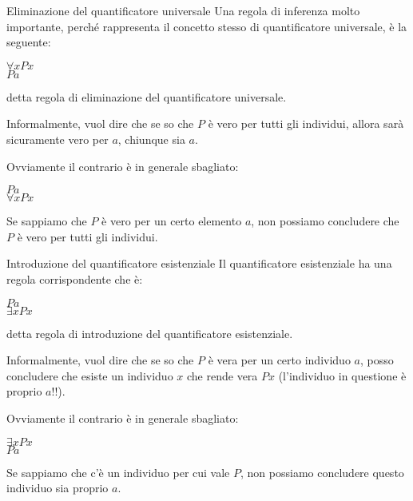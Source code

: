 \documentclass[aspectratio=169,10pt,dvipsnames,xcolor=table,handout]{beamer}
\begin{document}
\begin{frame}{Eliminazione del quantificatore universale}
    Una regola di inferenza molto importante, perché rappresenta il concetto stesso di quantificatore universale, è la seguente:
    \begin{center}
        \begin{inference}
            $\forall x Px$\\
            \hline
            $Pa$
        \end{inference}
    \end{center}
    detta regola di \alert{eliminazione del quantificatore universale}.

    \medskip
    Informalmente, vuol dire che se so che $P$ è vero per tutti gli individui, allora sarà sicuramente vero per $a$, chiunque sia $a$.

    \medskip
    Ovviamente il contrario è in generale sbagliato:
    \begin{center}
        \begin{inference}
            $Pa$\\
            \hline
            $\forall x Px$
        \end{inference}
    \end{center}
    Se sappiamo che $P$ è vero per un certo elemento $a$, non possiamo concludere che $P$ è vero per tutti gli individui.
\end{frame}

\begin{frame}{Introduzione del quantificatore esistenziale}
    Il quantificatore esistenziale ha una regola corrispondente che è:
    \begin{center}
        \begin{inference}
            $Pa$\\
            \hline
            $\exists x Px$
        \end{inference}
    \end{center}
    detta regola di \alert{introduzione del quantificatore esistenziale}.

    \medskip
    Informalmente, vuol dire che se so che $P$ è vera per un certo individuo $a$, posso concludere che esiste un individuo $x$ che rende vera $Px$ (l'individuo in questione è proprio $a$!!).

    \medskip
    Ovviamente il contrario è in generale sbagliato:
    \begin{center}
        \begin{inference}
            $\exists x Px$\\
            \hline
            $Pa$
        \end{inference}
    \end{center}
    Se sappiamo che c'è un individuo per cui vale $P$, non possiamo concludere questo individuo sia proprio $a$.
\end{frame}
\end{document}
